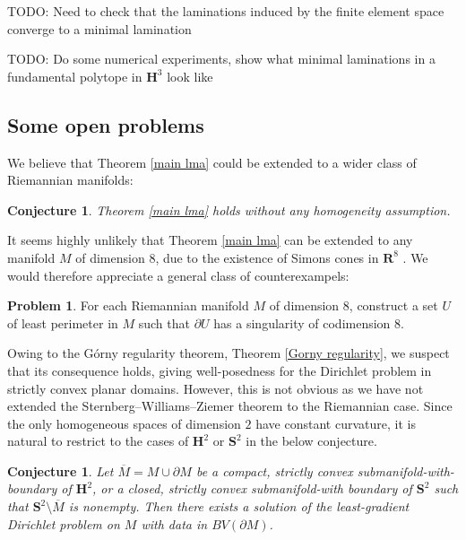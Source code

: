 \documentclass[reqno,12pt,letterpaper]{amsart}
\newcommand{\RR}{\mathbf{R}}
\newcommand{\Hyp}{\mathbf H}
\newcommand{\Sph}{\mathbf S}
\newtheorem{conjecture}[theorem]{Conjecture}
\theoremstyle{definition}
\newtheorem{problem}[theorem]{Problem}
\numberwithin{equation}{section}
\begin{document}
TODO: Need to check that the laminations induced by the finite element space converge to a minimal lamination

TODO: Do some numerical experiments, show what minimal laminations in a fundamental polytope in $\Hyp^3$ look like



\subsection{Some open problems}
We believe that Theorem \ref{main lma} could be extended to a wider class of Riemannian manifolds:

\begin{conjecture}\label{main conj}
Theorem \ref{main lma} holds without any homogeneity assumption.
\end{conjecture}

It seems highly unlikely that Theorem \ref{main lma} can be extended to any manifold $M$ of dimension $8$, due to the existence of Simons cones in $\RR^8$ \cite[Theorem A]{BOMBIERI1969}.
We would therefore appreciate a general class of counterexampels:

\begin{problem}
For each Riemannian manifold $M$ of dimension $8$, construct a set $U$ of least perimeter in $M$ such that $\partial U$ has a singularity of codimension $8$.
\end{problem}

Owing to the G\'orny regularity theorem, Theorem \ref{Gorny regularity}, we suspect that its consequence \cite[Theorem 1.1]{górny2017planar} holds, giving well-posedness for the Dirichlet problem in strictly convex planar domains.
However, this is not obvious as we have not extended the Sternberg--Williams--Ziemer theorem \cite{ZiemerWilliamsSternberg1992} to the Riemannian case.
Since the only homogeneous spaces of dimension $2$ have constant curvature, it is natural to restrict to the cases of $\Hyp^2$ or $\Sph^2$ in the below conjecture.

\begin{conjecture}
Let $\overline M = M \cup \partial M$ be a compact, strictly convex submanifold-with-boundary of $\Hyp^2$, or a closed, strictly convex submanifold-with boundary of $\Sph^2$ such that $\Sph^2 \setminus \overline M$ is nonempty.
Then there exists a solution of the least-gradient Dirichlet problem on $M$ with data in $BV(\partial M)$.
\end{conjecture}
\end{document}
